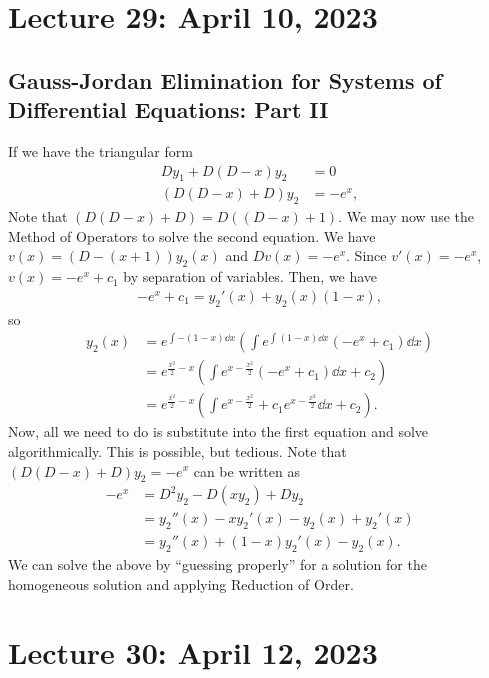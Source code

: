 \pagebreak

\section{Lecture 29: April 10, 2023}

    \subsection{Gauss-Jordan Elimination for Systems of Differential Equations: Part II}

        If we have the triangular form
        \begin{align*}
            Dy_1+D(D-x)y_2&=0 \\
            (D(D-x)+D)y_2&=-e^x,
        \end{align*}
        Note that \((D(D-x)+D)=D((D-x)+1)\). We may now use the Method of Operators to solve the second equation. We have \(v(x)=(D-(x+1))y_2(x)\) and \(Dv(x)=-e^x\). Since \(v'(x)=-e^x\), \(v(x)=-e^{x}+c_1\) by separation of variables. Then, we have
        \begin{align*}
            -e^x+c_1=y_2'(x)+y_2(x)(1-x),
        \end{align*}
        so
        \begin{align*}
            y_2(x)&=e^{\int -(1-x)\dd x}\left(\int e^{\int (1-x)\dd x}(-e^x+c_1)\dd x\right) \\
            &=e^{\frac{x^2}{2}-x}\left(\int e^{x-\frac{x^2}{2}}(-e^x+c_1)\dd x+c_2\right) \\
            &=e^{\frac{x^2}{2}-x}\left(\int e^{x-\frac{x^2}{2}}+c_1e^{x-\frac{x^2}{2}}\dd x+c_2\right).
        \end{align*}
        Now, all we need to do is substitute into the first equation and solve algorithmically. This is possible, but tedious. Note that \((D(D-x)+D)y_2=-e^x\) can be written as
        \begin{align*}
            -e^x&=D^2y_2-D(xy_2)+Dy_2 \\
            &=y_2''(x)-xy_2'(x)-y_2(x)+y_2'(x) \\
            &=y_2''(x)+(1-x)y_2'(x)-y_2(x).
        \end{align*}
        We can solve the above by ``guessing properly'' for a solution for the homogeneous solution and applying Reduction of Order.

    \pagebreak

\section{Lecture 30: April 12, 2023}

